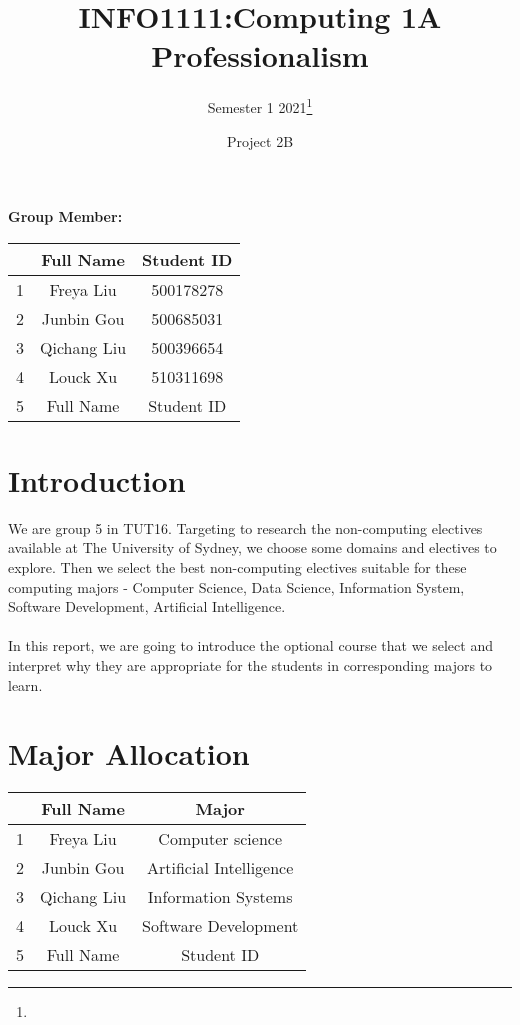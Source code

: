 \documentclass{article}
\title{INFO1111:Computing 1A Professionalism}
\author{Semester 1 2021\thanks{}}
\date{Project 2B}
\begin{document}
	
	
	\begin{titlepage}
		\maketitle
		\begin{title}
			\begin{center}
				\textbf{Group Member:}
			\end{center}
		\end{title}
		\begin{center}
			
			\begin{tabular}{|c|c|c|}
				\hline &Full Name& Student ID\\
				\hline 1& Freya Liu & 500178278  \\
				\hline 2& Junbin Gou & 500685031  \\
				\hline 3&Qichang Liu& 500396654 \\
				\hline 4& Louck Xu & 510311698  \\
				\hline 5&Full Name& Student ID  \\
				\hline
			\end{tabular}
		\end{center}
	\end{titlepage}
	
	\section{Introduction}
	We are group 5 in TUT16. Targeting to research the non-computing electives available at The University of Sydney, we choose some domains and electives to explore. Then we select the best non-computing electives suitable for these computing majors - Computer Science, Data Science, Information System, Software Development, Artificial Intelligence. \\
	\\
	In this report, we are going to introduce the optional course that we select and interpret why they are appropriate for the students in corresponding majors to learn.
	\section{Major Allocation}
	\begin{center}
		\begin{larger}
			\begin{tabular}{|c|c|c|}
				\hline &Full Name& Major\\
				\hline 1& Freya Liu & Computer science  \\
				\hline 2& Junbin Gou & Artificial Intelligence  \\
				\hline 3& Qichang Liu& Information Systems  \\
				\hline 4& Louck Xu & Software Development  \\
				\hline 5&Full Name& Student ID  \\
				\hline
			\end{tabular}
		\end{larger}
	\end{center}
	
\end{document}
